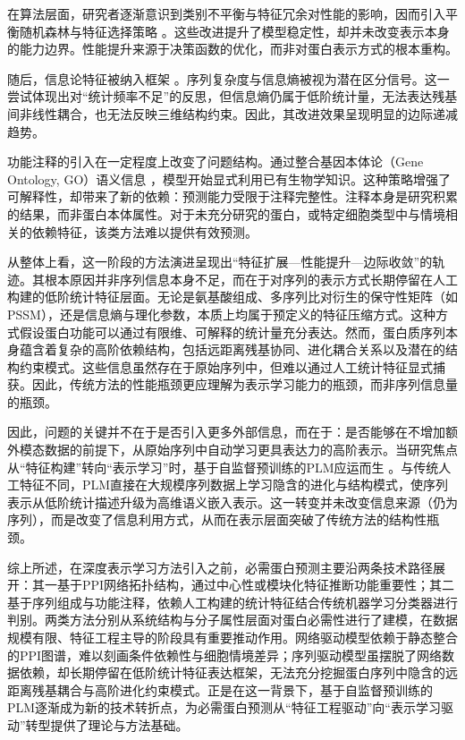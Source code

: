 在算法层面，研究者逐渐意识到类别不平衡与特征冗余对性能的影响，因而引入平衡随机森林与特征选择策略 \cite{anaissi2013balanced}。这些改进提升了模型稳定性，却并未改变表示本身的能力边界。性能提升来源于决策函数的优化，而非对蛋白表示方式的根本重构。

随后，信息论特征被纳入框架 \cite{nigatu2017sequence}。序列复杂度与信息熵被视为潜在区分信号。这一尝试体现出对“统计频率不足”的反思，但信息熵仍属于低阶统计量，无法表达残基间非线性耦合，也无法反映三维结构约束。因此，其改进效果呈现明显的边际递减趋势。

功能注释的引入在一定程度上改变了问题结构。通过整合基因本体论（Gene Ontology, GO）语义信息 \cite{zhang2018detecting}，模型开始显式利用已有生物学知识。这种策略增强了可解释性，却带来了新的依赖：预测能力受限于注释完整性。注释本身是研究积累的结果，而非蛋白本体属性。对于未充分研究的蛋白，或特定细胞类型中与情境相关的依赖特征，该类方法难以提供有效预测。

从整体上看，这一阶段的方法演进呈现出“特征扩展—性能提升—边际收敛”的轨迹。其根本原因并非序列信息本身不足，而在于对序列的表示方式长期停留在人工构建的低阶统计特征层面。无论是氨基酸组成、多序列比对衍生的保守性矩阵（如PSSM），还是信息熵与理化参数，本质上均属于预定义的特征压缩方式。这种方式假设蛋白功能可以通过有限维、可解释的统计量充分表达。然而，蛋白质序列本身蕴含着复杂的高阶依赖结构，包括远距离残基协同、进化耦合关系以及潜在的结构约束模式。这些信息虽然存在于原始序列中，但难以通过人工统计特征显式捕获。因此，传统方法的性能瓶颈更应理解为表示学习能力的瓶颈，而非序列信息量的瓶颈。

因此，问题的关键并不在于是否引入更多外部信息，而在于：是否能够在不增加额外模态数据的前提下，从原始序列中自动学习更具表达力的高阶表示。当研究焦点从“特征构建”转向“表示学习”时，基于自监督预训练的PLM应运而生 \cite{rives2021biological,lin2023evolutionary}。与传统人工特征不同，PLM直接在大规模序列数据上学习隐含的进化与结构模式，使序列表示从低阶统计描述升级为高维语义嵌入表示。这一转变并未改变信息来源（仍为序列），而是改变了信息利用方式，从而在表示层面突破了传统方法的结构性瓶颈。

综上所述，在深度表示学习方法引入之前，必需蛋白预测主要沿两条技术路径展开：其一基于PPI网络拓扑结构，通过中心性或模块化特征推断功能重要性；其二基于序列组成与功能注释，依赖人工构建的统计特征结合传统机器学习分类器进行判别。两类方法分别从系统结构与分子属性层面对蛋白必需性进行了建模，在数据规模有限、特征工程主导的阶段具有重要推动作用。网络驱动模型依赖于静态整合的PPI图谱，难以刻画条件依赖性与细胞情境差异；序列驱动模型虽摆脱了网络数据依赖，却长期停留在低阶统计特征表达框架，无法充分挖掘蛋白序列中隐含的远距离残基耦合与高阶进化约束模式。正是在这一背景下，基于自监督预训练的PLM逐渐成为新的技术转折点，为必需蛋白预测从“特征工程驱动”向“表示学习驱动”转型提供了理论与方法基础。

